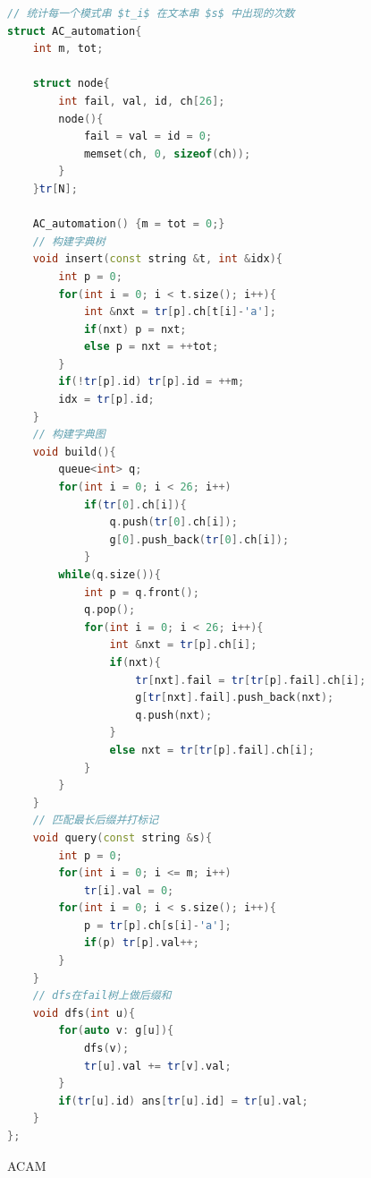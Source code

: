 \begin{lstlisting}[language = C++]
// 统计每一个模式串 $t_i$ 在文本串 $s$ 中出现的次数
struct AC_automation{
    int m, tot;
    
    struct node{
        int fail, val, id, ch[26];
        node(){
            fail = val = id = 0;
            memset(ch, 0, sizeof(ch));
        }
    }tr[N];
    
    AC_automation() {m = tot = 0;}
    // 构建字典树
    void insert(const string &t, int &idx){
        int p = 0;
        for(int i = 0; i < t.size(); i++){
            int &nxt = tr[p].ch[t[i]-'a'];
            if(nxt) p = nxt;
            else p = nxt = ++tot;
        }
        if(!tr[p].id) tr[p].id = ++m;
        idx = tr[p].id;
    }
    // 构建字典图
    void build(){
        queue<int> q;
        for(int i = 0; i < 26; i++)
            if(tr[0].ch[i]){
                q.push(tr[0].ch[i]);
                g[0].push_back(tr[0].ch[i]);
            }
        while(q.size()){
            int p = q.front();
            q.pop();
            for(int i = 0; i < 26; i++){
                int &nxt = tr[p].ch[i];
                if(nxt){
                    tr[nxt].fail = tr[tr[p].fail].ch[i];
                    g[tr[nxt].fail].push_back(nxt);
                    q.push(nxt);
                }
                else nxt = tr[tr[p].fail].ch[i];
            }
        }
    }
    // 匹配最长后缀并打标记
    void query(const string &s){
        int p = 0;
        for(int i = 0; i <= m; i++)
            tr[i].val = 0;
        for(int i = 0; i < s.size(); i++){
            p = tr[p].ch[s[i]-'a'];
            if(p) tr[p].val++;
        }
    }
    // dfs在fail树上做后缀和
    void dfs(int u){
        for(auto v: g[u]){
            dfs(v);
            tr[u].val += tr[v].val;
        }
        if(tr[u].id) ans[tr[u].id] = tr[u].val;
    }
};
\end{lstlisting}

ACAM 

